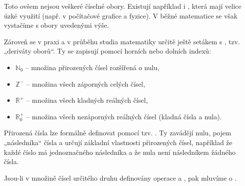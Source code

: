 \documentclass[12pt,a4paper]{article}
\begin{document}
Toto ovšem nejsou veškeré číselné obory. Existují například i , 
která mají velice úzké využití (např. v počítačové grafice a fyzice).  
V běžné matematice se však vystačíme s obory uvedenými výše.

Zároveň se v praxi a v průběhu studia matematiky určitě ještě setákem s , 
tzv. „deriváty oborů“. Ty se zapisují pomocí horních nebo dolních indexů:
\begin{itemize}
    \item $\mathbb{N}_0$ – množina přirozených čísel rozšířená o nulu,
    \item $\mathbb{Z}^-$ – množina všech záporných celých čísel,
    \item $\mathbb{R}^+$ – množina všech kladných reálných čísel,
    \item $\mathbb{R}_0^+$ – množina všech nezáporných reálných čísel (kladná čísla a nula).
\end{itemize}

\begin{notebox}
Přirozená čísla lze formálně definovat pomocí tzv. 
. Ty zavádějí nulu, pojem „následníka“ čísla
a určují základní vlastnosti přirozených čísel, například že každé číslo má
jednoznačného následníka a že nula není následníkem žádného čísla.
\end{notebox}

\begin{definitionbox}
Jsou-li v množině čísel určitého druhu definovány operace  a 
, pak mluvíme o .
\end{definitionbox}
\end{document}
